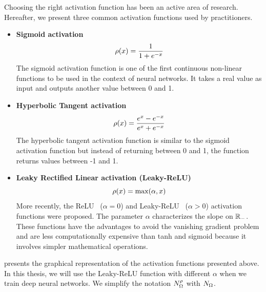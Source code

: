 Choosing the right activation function has been an active area of research. 
Hereafter, we present three common activation functions used by practitioners.
\begin{itemize}
  \item \textbf{Sigmoid activation} \cite{han1995influence}
    \begin{equation*}
      \rho(x) = \frac{1}{1+e^{-x}} 
    \end{equation*}
    The sigmoid activation function is one of the first continuous non-linear functions to be used in the context of neural networks.
		It takes a real value as input and outputs another value between 0 and 1.
  \item \textbf{Hyperbolic Tangent activation} \cite{karlik2011performance}
    \begin{equation*}
      \rho(x) = \frac{e^x - e^{-x}}{e^x + e^{-x}}
    \end{equation*}
    The hyperbolic tangent activation function is similar to the sigmoid activation function but instead of returning between 0 and 1, the function returns values between -1 and 1.     
  \item \textbf{Leaky Rectified Linear activation (Leaky-ReLU)} \cite{maas2013rectifier}
    \begin{equation*}
      \rho(x) = \max(\alpha, x)
    \end{equation*}
    More recently, the ReLU~\cite{nair2010rectified} ($\alpha = 0$) and Leaky-ReLU~\cite{maas2013rectifier} ($\alpha > 0$) activation functions were proposed.
    The parameter $\alpha$ characterizes the slope on $\mathbb{R}_-$.
    These functions have the advantages to avoid the vanishing gradient problem and are less computationally expensive than tanh and sigmoid because it involves simpler mathematical operations.
\end{itemize}

\noindent
{} presents the graphical representation of the activation functions presented above.
In this thesis, we will use the Leaky-ReLU function with different $\alpha$ when we train deep neural networks.
We simplify the notation $N^\rho_\Omega$ with $N_\Omega$.




